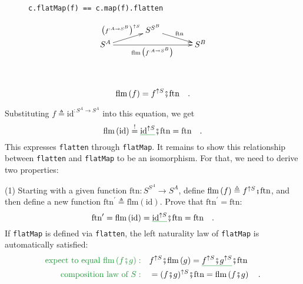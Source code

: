 \begin{wrapfigure}{l}{0.4\columnwidth}%
\vspace{-0.75\baselineskip}

\begin{lstlisting}
c.flatMap(f) == c.map(f).flatten
\end{lstlisting}
\vspace{0.2\baselineskip}
\[
\xymatrix{\xyScaleY{0.2pc}\xyScaleX{3pc} & S^{S^{B}}\ar[rd]\sp(0.5){\ \text{ftn}\ }\\
S^{A}\ar[ru]\sp(0.5){\big(f^{:A\rightarrow S^{B}}\big)^{\uparrow S}\ }\ar[rr]\sb(0.5){\text{flm}\,\big(f^{:A\rightarrow S^{B}}\big)\,} &  & S^{B}
}
\]

\vspace{-0.3\baselineskip}
\end{wrapfigure}%

~\vspace{-1.5\baselineskip}

\[
\text{flm}\left(f\right)=f^{\uparrow S}\bef\text{ftn}\quad.
\]

\noindent Substituting $f\triangleq\text{id}^{:S^{A}\rightarrow S^{A}}$
into this equation, we get
\[
\text{flm}\left(\text{id}\right)\overset{!}{=}\gunderline{\text{id}^{\uparrow S}}\bef\text{ftn}=\text{ftn}\quad.
\]
This expresses \lstinline!flatten! through \lstinline!flatMap!.
It remains to show this relationship between \lstinline!flatten!
and \lstinline!flatMap! to be an isomorphism. For that, we need to
derive two properties:

(1) Starting with a given function $\text{ftn}:S^{S^{A}}\rightarrow S^{A}$,
define $\text{flm}\left(f\right)\triangleq f^{\uparrow S}\bef\text{ftn}$,
and then define a new function $\text{ftn}^{\prime}\triangleq\text{flm}\left(\text{id}\right)$.
Prove that $\text{ftn}^{\prime}=\text{ftn}$:
\[
\text{ftn}^{\prime}=\text{flm}\left(\text{id}\right)=\gunderline{\text{id}^{\uparrow S}}\bef\text{ftn}=\text{ftn}\quad.
\]
If \lstinline!flatMap! is defined via \lstinline!flatten!, the left
naturality law of \lstinline!flatMap! is automatically satisfied:
\begin{align*}
{\color{greenunder}\text{expect to equal }\text{flm}\left(f\bef g\right):}\quad & f^{\uparrow S}\bef\text{flm}\left(g\right)=\gunderline{f^{\uparrow S}\bef g^{\uparrow S}}\bef\text{ftn}\\
{\color{greenunder}\text{composition law of }S:}\quad & =(f\bef g)^{\uparrow S}\bef\text{ftn}=\text{flm}\left(f\bef g\right)\quad.
\end{align*}

